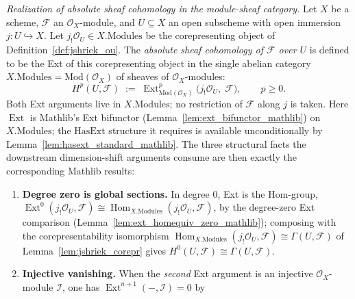 \begin{definition}

  \label{def:absolute_cohomology}
  \textit{Realization of absolute sheaf cohomology in the module-sheaf category.}
  Let \(X\) be a scheme, \(\mathcal{F}\) an \(\mathcal{O}_X\)-module, and \(U \subseteq
  X\) an open subscheme with open immersion \(j : U \hookrightarrow X\). Let
  \(j_!\mathcal{O}_U \in X.\mathrm{Modules}\) be the corepresenting object of
  Definition~\ref{def:jshriek_ou}. The \emph{absolute sheaf cohomology of \(\mathcal{F}\)
  over \(U\)} is defined to be the Ext of this corepresenting object in the single
  abelian category \(X.\mathrm{Modules} = \mathrm{Mod}(\mathcal{O}_X)\) of sheaves of
  \(\mathcal{O}_X\)-modules:
  \[
    H^p(U, \mathcal{F}) \;:=\; \operatorname{Ext}^p_{\mathrm{Mod}(\mathcal{O}_X)}
      \bigl(j_!\mathcal{O}_U,\; \mathcal{F}\bigr),
    \qquad p \geq 0.
  \]
  Both Ext arguments live in \(X.\mathrm{Modules}\); no restriction of \(\mathcal{F}\)
  along \(j\) is taken. Here \(\operatorname{Ext}\) is Mathlib's Ext bifunctor
  (Lemma~\ref{lem:ext_bifunctor_mathlib}) on \(X.\mathrm{Modules}\); the
  \(\mathrm{HasExt}\) structure it requires is available unconditionally by
  Lemma~\ref{lem:hasext_standard_mathlib}. The three structural facts the downstream
  dimension-shift arguments consume are then exactly the corresponding Mathlib results:
  \begin{enumerate}
  \item \textbf{Degree zero is global sections.} In degree \(0\), Ext is the Hom-group,
    \(\operatorname{Ext}^0(j_!\mathcal{O}_U, \mathcal{F}) \cong
    \operatorname{Hom}_{X.\mathrm{Modules}}(j_!\mathcal{O}_U, \mathcal{F})\), by the
    degree-zero Ext comparison (Lemma~\ref{lem:ext_homequiv_zero_mathlib}); composing
    with the corepresentability isomorphism
    \(\operatorname{Hom}_{X.\mathrm{Modules}}(j_!\mathcal{O}_U, \mathcal{F}) \cong
    \Gamma(U, \mathcal{F})\) of Lemma~\ref{lem:jshriek_corepr} gives \(H^0(U,
    \mathcal{F}) \cong \Gamma(U, \mathcal{F})\).
  \item \textbf{Injective vanishing.} When the \emph{second} Ext argument is an
    injective \(\mathcal{O}_X\)-module \(\mathcal{I}\), one has
    \(\operatorname{Ext}^{n+1}(-, \mathcal{I}) = 0\) by

\end{enumerate}
\end{definition}
